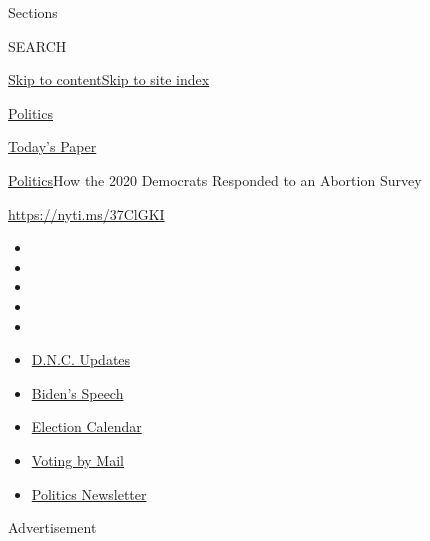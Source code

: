 Sections

SEARCH

\protect\hyperlink{site-content}{Skip to
content}\protect\hyperlink{site-index}{Skip to site index}

\href{https://www.nytimes3xbfgragh.onion/section/politics}{Politics}

\href{https://myaccount.nytimes3xbfgragh.onion/auth/login?response_type=cookie\&client_id=vi}{}

\href{https://www.nytimes3xbfgragh.onion/section/todayspaper}{Today's
Paper}

\href{/section/politics}{Politics}\textbar{}How the 2020 Democrats
Responded to an Abortion Survey

\url{https://nyti.ms/37ClGKI}

\begin{itemize}
\item
\item
\item
\item
\item
\end{itemize}

\begin{itemize}
\item
  \href{https://www.nytimes3xbfgragh.onion/live/2020/08/21/us/dnc-convention-election?action=click\&pgtype=Article\&state=default\&region=TOP_BANNER\&context=storylines_menu}{D.N.C.
  Updates}
\item
  \href{https://www.nytimes3xbfgragh.onion/2020/08/20/us/politics/biden-presidential-nomination-dnc.html?action=click\&pgtype=Article\&state=default\&region=TOP_BANNER\&context=storylines_menu}{Biden's
  Speech}
\item
  \href{https://www.nytimes3xbfgragh.onion/interactive/2019/us/elections/2020-presidential-election-calendar.html?action=click\&pgtype=Article\&state=default\&region=TOP_BANNER\&context=storylines_menu}{Election
  Calendar}
\item
  \href{https://www.nytimes3xbfgragh.onion/interactive/2020/08/11/us/politics/vote-by-mail-us-states.html?action=click\&pgtype=Article\&state=default\&region=TOP_BANNER\&context=storylines_menu}{Voting
  by Mail}
\item
  \href{https://www.nytimes3xbfgragh.onion/newsletters/politics?action=click\&pgtype=Article\&state=default\&region=TOP_BANNER\&context=storylines_menu}{Politics
  Newsletter}
\end{itemize}

Advertisement

